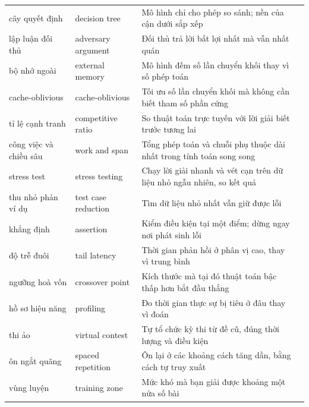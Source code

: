 \documentclass[algorithm.tex]{subfiles}
\begin{document}
\begin{center}
\begin{longtable}{@{}L{3.5cm}L{3.9cm}L{6.2cm}L{1.5cm}@{}}
cây quyết định & decision tree & Mô hình chỉ cho phép so sánh; nền của cận dưới sắp xếp & \\
lập luận đối thủ & adversary argument & Đối thủ trả lời bất lợi nhất mà vẫn nhất quán & \\
bộ nhớ ngoài & external memory & Mô hình đếm số lần chuyển khối thay vì số phép toán & \\
cache-oblivious & cache-oblivious & Tối ưu số lần chuyển khối mà không cần biết tham số phần cứng & \\
tỉ lệ cạnh tranh & competitive ratio & So thuật toán trực tuyến với lời giải biết trước tương lai & \\
công việc và chiều sâu & work and span & Tổng phép toán và chuỗi phụ thuộc dài nhất trong tính toán song song & \\
stress test & stress testing & Chạy lời giải nhanh và vét cạn trên dữ liệu nhỏ ngẫu nhiên, so kết quả & \\
thu nhỏ phản ví dụ & test case reduction & Tìm dữ liệu nhỏ nhất vẫn giữ được lỗi & \\
khẳng định & assertion & Kiểm điều kiện tại một điểm; dừng ngay nơi phát sinh lỗi & \\
độ trễ đuôi & tail latency & Thời gian phản hồi ở phân vị cao, thay vì trung bình & \\
ngưỡng hoà vốn & crossover point & Kích thước mà tại đó thuật toán bậc thấp hơn bắt đầu thắng & \\
hồ sơ hiệu năng & profiling & Đo thời gian thực sự bị tiêu ở đâu thay vì đoán & \\
thi ảo & virtual contest & Tự tổ chức kỳ thi từ đề cũ, đúng thời lượng và điều kiện & \\
ôn ngắt quãng & spaced repetition & Ôn lại ở các khoảng cách tăng dần, bằng cách tự truy xuất & \\
vùng luyện & training zone & Mức khó mà bạn giải được khoảng một nửa số bài & \\
\bottomrule
\end{longtable}
\end{center}
\end{document}
